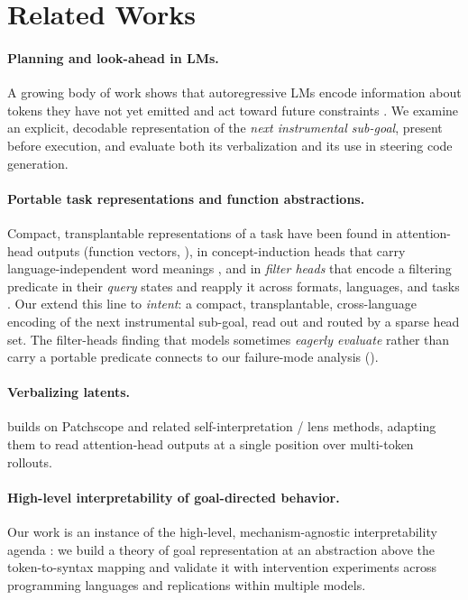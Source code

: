 \section{Related Works}
\label{sec:related}

\paragraph{Planning and look-ahead in LMs.} A growing body of work shows that autoregressive LMs
encode information about tokens they have not yet emitted and act toward future constraints
\citep{pal2023futurelens, lindsey2025biology}. We examine
an explicit, decodable representation of the \emph{next instrumental sub-goal}, present before
execution, and evaluate both its verbalization and its use in steering code generation.

\paragraph{Portable task representations and function abstractions.} Compact, transplantable
representations of a task have been found in attention-head outputs (function vectors,
\citealp{todd2024function}), in concept-induction heads that carry language-independent word
meanings \citep{feucht2025dual}, and in \emph{filter heads} that encode a filtering predicate in
their \emph{query} states and reapply it across formats, languages, and tasks
\citep{sensharma2025filterheads}. Our \goalheads extend this line to \emph{intent}: a compact,
transplantable, cross-language encoding of the next instrumental sub-goal, read out and routed by a
sparse head set. The filter-heads finding that models sometimes \emph{eagerly evaluate} rather than
carry a portable predicate connects to our failure-mode analysis ().

\paragraph{Verbalizing latents.} \goalscope builds on Patchscope \citep{ghandeharioun2024patchscope}
and related self-interpretation / lens methods, adapting them to read attention-head outputs at a
single position over multi-token rollouts.

\paragraph{High-level interpretability of goal-directed behavior.} Our work is an instance of the
high-level, mechanism-agnostic interpretability agenda \citep{greenblatt2024highlevel}: we build a
theory of goal representation at an abstraction above the token-to-syntax mapping and validate it with
intervention experiments across programming languages and replications within multiple models.
